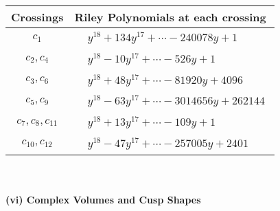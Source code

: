\documentclass[1p]{elsarticle_modified}
\theoremstyle{definition}
\begin{document}
\begin{tabular}{m{50pt}|m{274pt}}
Crossings & \hspace{64pt}Riley Polynomials at each crossing \\
\hline $$\begin{aligned}c_{1}\end{aligned}$$&$\begin{aligned}
&y^{18}+134 y^{17}+\cdots-240078 y+1
\end{aligned}$\\
\hline $$\begin{aligned}c_{2},c_{4}\end{aligned}$$&$\begin{aligned}
&y^{18}-10 y^{17}+\cdots-526 y+1
\end{aligned}$\\
\hline $$\begin{aligned}c_{3},c_{6}\end{aligned}$$&$\begin{aligned}
&y^{18}+48 y^{17}+\cdots-81920 y+4096
\end{aligned}$\\
\hline $$\begin{aligned}c_{5},c_{9}\end{aligned}$$&$\begin{aligned}
&y^{18}-63 y^{17}+\cdots-3014656 y+262144
\end{aligned}$\\
\hline $$\begin{aligned}c_{7},c_{8},c_{11}\end{aligned}$$&$\begin{aligned}
&y^{18}+13 y^{17}+\cdots-109 y+1
\end{aligned}$\\
\hline $$\begin{aligned}c_{10},c_{12}\end{aligned}$$&$\begin{aligned}
&y^{18}-47 y^{17}+\cdots-257005 y+2401
\end{aligned}$\\
\hline
\end{tabular}\\~\\
\newpage\flushleft \textbf{(vi) Complex Volumes and Cusp Shapes}
\end{document}
